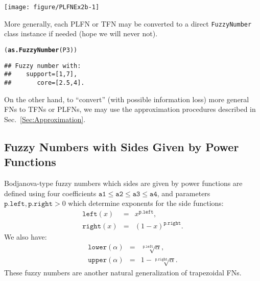 \documentclass[11pt]{article}\usepackage[]{graphicx}\usepackage[]{color}
\makeatletter
\newcommand{\hlstd}[1]{\textcolor[rgb]{0.345,0.345,0.345}{#1}}%
\newcommand{\hlkwd}[1]{\textcolor[rgb]{0.737,0.353,0.396}{\textbf{#1}}}%
\newenvironment{kframe}{%
 \def\at@end@of@kframe{}%
 \ifinner\ifhmode%
  \def\at@end@of@kframe{\end{minipage}}%
  \begin{minipage}{\columnwidth}%
 \fi\fi%
 \def\FrameCommand##1{\hskip\@totalleftmargin \hskip-\fboxsep
 \colorbox{shadecolor}{##1}\hskip-\fboxsep
     \hskip-\linewidth \hskip-\@totalleftmargin \hskip\columnwidth}%
 \MakeFramed {\advance\hsize-\width
   \@totalleftmargin\z@ \linewidth\hsize
   \@setminipage}}%
 {\par\unskip\endMakeFramed%
 \at@end@of@kframe}
\newenvironment{knitrout}{}{} %
\makeatother
\begin{document}
\begin{center}
\begin{knitrout}\small
{}\color{fgcolor}

{\centering \texttt{[image: figure/PLFNEx2b-1]} 

}



\end{knitrout}
\end{center}

\noindent
More generally, each PLFN or TFN may be converted
to a direct \texttt{FuzzyNumber} class instance if needed
(hope we will never not).

\begin{knitrout}\small
{}\color{fgcolor}\begin{kframe}
\begin{alltt}
\hlstd{(}\hlkwd{as.FuzzyNumber}\hlstd{(P3))}
\end{alltt}
\begin{verbatim}
## Fuzzy number with:
##    support=[1,7],
##       core=[2.5,4].
\end{verbatim}
\end{kframe}
\end{knitrout}

On the other hand, to ``convert'' (with possible information loss)
more general FNs to TFNs or PLFNs, we may use the approximation
procedures described in Sec.~\ref{Sec:Approximation}.



\subsection{Fuzzy Numbers with Sides Given by Power Functions}\label{Sec:powerdef}

Bodjanova-type \cite{Bodjanova2005:medianfn}
fuzzy numbers which sides are given by power functions
are defined using four coefficients
$\mathtt{a1}\le\mathtt{a2}\le\mathtt{a3}\le\mathtt{a4}$,
and parameters $\mathtt{p.left}, \mathtt{p.right}>0$ which determine
exponents for the side functions:
\begin{eqnarray}
\mathtt{left}(x)&=&x^{\mathtt{p.left}},\\
\mathtt{right}(x)&=&(1-x)^{\mathtt{p.right}}.
\end{eqnarray}
We also have:
\begin{eqnarray}
\mathtt{lower}(\alpha)&=&\sqrt[\mathtt{p.left}]{\alpha},\\
\mathtt{upper}(\alpha)&=&1-\sqrt[\mathtt{p.right}]{\alpha}.
\end{eqnarray}
These fuzzy numbers are another natural generalization of trapezoidal FNs.
\end{document}
